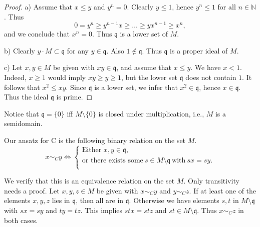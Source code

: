 \documentclass [12pt,a4paper,reqno]{amsart}
\begin{document}
\begin{proof} a) Assume that $x \leq y$ and $y^n = 0$. Clearly $y
\leq 1$, hence $y^n \leq 1$ for all $n \in {\mathbb N}$. Thus
$$ 0 = y^n \geq y^{n-1} x \geq \dots \geq y x^{n-1} \geq x^n,$$
and we conclude that $x^n =0$. Thus ${\mathfrak q}$ is a lower set of $M$.
{\vskip 1.5mm \noindent}

b) Clearly $y \cdot M \subset {\mathfrak q}$ for any  $y \in {\mathfrak q} $. Also
$1 \notin {\mathfrak q}$. Thus ${\mathfrak q}$ is a proper ideal of $M$. {\vskip 1.5mm \noindent}

c) Let $x,y \in M$ be given with $xy \in {\mathfrak q}$, and assume that $x
\leq y$. We have $x < 1$. Indeed, $x \geq 1$ would imply $xy \geq
y \geq 1$, but the lower set ${\mathfrak q}$ does not contain $1$. It
follows that $x^2 \leq xy$. Since ${\mathfrak q}$ is a lower set, we infer
that $x^2 \in {\mathfrak q}$, hence $x \in {\mathfrak q}$. Thus the ideal ${\mathfrak q}$ is
prime.
\end{proof}

Notice that ${\mathfrak q}=\{0\}$ iff $M\setminus\{0\}$ is closed under
multiplication, i.e., $M$ is a semidomain. {\vskip 1.5mm \noindent}

Our ansatz for C is the following binary relation on the set $M$.
\begin{equation} x\sim_Cy\Leftrightarrow \left\{ \begin{array}{l}
  \text{Either\ }                         x,y\in{\mathfrak q}, \\[1mm]
                                           \text{or there exists some}\ s\in
M\setminus{\mathfrak q}\ \text{with}\ sx=sy. \\
                                         \end{array}\right.
\end{equation}

We verify that this is an equivalence relation on the set $M.$
Only transitivity needs a proof. Let $x,y,z\in M$ be given with
$x\sim_Cy$ and $y\sim_Cz.$ If at least one of the elements $x,y,z$
lies in ${\mathfrak q}$, then all are  in ${\mathfrak q}.$ Otherwise we have
elements $s,t$ in $M\setminus{\mathfrak q}$ with $sx=sy$ and $ty=tz.$ This
implies $stx=stz$ and $st\in M \setminus {\mathfrak q}.$ Thus $x\sim_C z$
in both cases.
\end{document}
